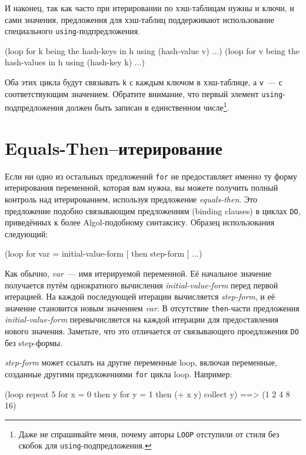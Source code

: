И наконец, так как часто при итерировании по хэш-таблицам нужны и ключи, и сами значения,
предложения для хэш-таблиц поддерживают использование специального
\lstinline{using}-подпредложения.

\begin{myverb}
(loop for k being the hash-keys in h using (hash-value v) ...)
(loop for v being the hash-values in h using (hash-key k) ...)
\end{myverb}

Оба этих цикла будут связывать \lstinline{k} с каждым ключом в хэш-таблице, а \lstinline{v}~--- с
соответствующим значением. Обратите внимание, что первый элемент
\lstinline{using}-подпредложения должен быть записан в единственном числе\footnote{Даже не
    спрашивайте меня, почему авторы \lstinline{LOOP} отступили от стиля без скобок для
    \lstinline{using}-подпредложения.}.

\section{Equals-Then--итерирование}

Если ни одно из остальных предложений \lstinline{for} не предоставляет именно ту форму
итерирования переменной, которая вам нужна, вы можете получить полный контроль над
итерированием, используя предложение \textit{equals-then}. Это предложение подобно
связывающим предложениям (binding clauses) в циклах \lstinline{DO}, приведённых к более
Algol-подобному синтаксису. Образец использования следующий:

\begin{myverb}
(loop for var = initial-value-form [ then step-form ] ...)
\end{myverb}

Как обычно, \textit{var}~--- имя итерируемой переменной. Её начальное значение получается
путём однократного вычисления \textit{initial-value-form} перед первой итерацией. На
каждой последующей итерации вычисляется \textit{step-form}, и её значение становится новым
значением \textit{var}. В отсутствие \lstinline{then}-части предложения
\textit{initial-value-form} перевычисляется на каждой итерации для предоставления нового
значения. Заметьте, что это отличается от связывающего проедложения \lstinline{DO} без
step-формы.

\textit{step-form} может ссылать на другие переменные loop, включая переменные, созданные
другими предложениями \lstinline{for} цикла loop. Например:

\begin{myverb}
(loop repeat 5 
      for x = 0 then y
      for y = 1 then (+ x y)
      collect y) ==> (1 2 4 8 16)
\end{myverb}

